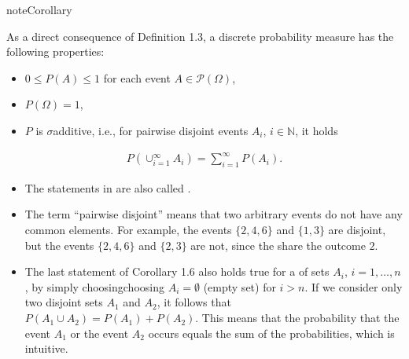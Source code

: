 \documentclass[letterpaper,10pt,english]{jupyterBook}
\begin{document}
\begin{sphinxadmonition}{note}{Corollary}

\sphinxAtStartPar
As a direct consequence of Definition 1.3, a discrete probability measure has the following properties:
\begin{itemize}
\item {} 
\sphinxAtStartPar
\(0 \le P(A) \le 1\) for each event \(A \in \mathcal{P}(\Omega)\),

\item {} 
\sphinxAtStartPar
\(P(\Omega) = 1\),

\item {} 
\sphinxAtStartPar
\(P\) is \(\sigma\)\sphinxhyphen{}additive, i.e., for pairwise disjoint events \(A_i\), \(i \in \mathbb{N}\), it holds

\end{itemize}
\begin{equation*}
\begin{split}P(\cup_{i=1}^{\infty} A_i) = \sum_{i=1}^{\infty} P(A_i).\end{split}
\end{equation*}\end{sphinxadmonition}
\begin{itemize}
\item {} 
\sphinxAtStartPar
The statements in {\hyperref[\detokenize{fund/fundprob:cor-discrdist}]{}} are also called .

\item {} 
\sphinxAtStartPar
The term “pairwise disjoint” means that two arbitrary events do not have any common elements. For example, the events \(\{2, 4, 6\}\) and \(\{1, 3\}\) are disjoint, but the events \(\{2, 4, 6\}\) and \(\{2, 3\}\) are not, since the share the outcome \(2\).

\item {} 
\sphinxAtStartPar
The last statement of Corollary 1.6 also holds true for a  of sets \(A_i\), \(i=1,\dots,n\), by simply choosingchoosing \(A_i = \emptyset\) (empty set) for \(i > n\). If we consider only two disjoint sets \(A_1\) and \(A_2\), it follows that \(P(A_1 \cup A_2) = P(A_1) + P(A_2)\). This means that the probability that the event \(A_1\) or the event \(A_2\) occurs equals the sum of the probabilities, which is intuitive.

\end{itemize}
\end{document}
